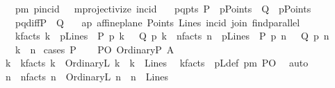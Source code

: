 \begin{isabellebody}
\ \ \ pm{\isacharcolon}{\kern0pt}\ {\isacartoucheopen}pincid\ {\isacharequal}{\kern0pt}\ \ mprojectivize\ {\isacharparenleft}{\kern0pt}incid{\isacharparenright}{\kern0pt}{\isacartoucheclose}\isanewline
\ \ \ pq{\isacharunderscore}{\kern0pt}pts{\isacharcolon}{\kern0pt}\ {\isachardoublequoteopen}P\ {\isasymin}\ pPoints\ {\isasymand}\ Q\ {\isasymin}\ pPoints{\isachardoublequoteclose}\isanewline
\ \ \ pq{\isacharunderscore}{\kern0pt}diff{\isacharcolon}{\kern0pt}{\isachardoublequoteopen}P\ {\isasymnoteq}\ Q{\isachardoublequoteclose}\isanewline
\ \ \ ap{\isacharcolon}{\kern0pt}\ {\isachardoublequoteopen}affine{\isacharunderscore}{\kern0pt}plane\ Points\ Lines\ incid\ join\ find{\isacharunderscore}{\kern0pt}parallel{\isachardoublequoteclose}\isanewline
\ \ \ k{\isacharunderscore}{\kern0pt}facts{\isacharcolon}{\kern0pt}\ {\isachardoublequoteopen}k\ {\isasymin}\ pLines\ {\isasymand}\ P\ p{\isasymlhd}\ k\ \ {\isasymand}\ Q\ p{\isasymlhd}\ k{\isachardoublequoteclose}\ \ n{\isacharunderscore}{\kern0pt}facts{\isacharcolon}{\kern0pt}\ {\isachardoublequoteopen}n\ {\isasymin}\ pLines\ {\isasymand}\ P\ p{\isasymlhd}\ n\ \ {\isasymand}\ Q\ p{\isasymlhd}\ n{\isachardoublequoteclose}\isanewline
\ \ \ {\isachardoublequoteopen}k\ {\isacharequal}{\kern0pt}\ n{\isachardoublequoteclose}\isanewline
%
\isadelimproof
%
\endisadelimproof
%
\isatagproof
{}\isamarkupfalse%
\ {\isacharparenleft}{\kern0pt}cases\ P{\isacharparenright}{\kern0pt}\isanewline
\ \ \isamarkupfalse%
\ PO{\isacharcolon}{\kern0pt}\ {\isacharparenleft}{\kern0pt}OrdinaryP\ A{\isacharparenright}{\kern0pt}\isanewline
\ \ \isamarkupfalse%
\ k{}\ \ k{}{\isacharunderscore}{\kern0pt}facts{\isacharcolon}{\kern0pt}\ {\isachardoublequoteopen}k\ {\isacharequal}{\kern0pt}\ OrdinaryL\ k{}\ {\isasymand}\ k{}\ {\isasymin}\ Lines{\isachardoublequoteclose}\ \isamarkupfalse%
\ k{\isacharunderscore}{\kern0pt}facts\ \ pLdef\ pm\ PO\ \isamarkupfalse%
\ auto\isanewline
\ \ \isamarkupfalse%
\ n{}\ \ n{}{\isacharunderscore}{\kern0pt}facts{\isacharcolon}{\kern0pt}\ {\isachardoublequoteopen}n\ {\isacharequal}{\kern0pt}\ OrdinaryL\ n{}\ {\isasymand}\ n{}\ {\isasymin}\ Lines{\isachardoublequoteclose}\ \isamarkupfalse%

\end{isabellebody}
